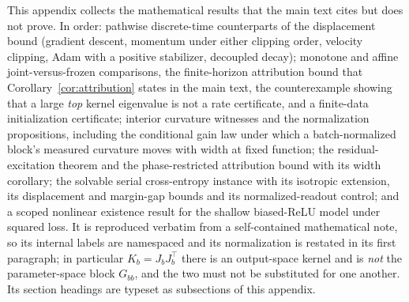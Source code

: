 This appendix collects the mathematical results that the main text cites but
does not prove. In order: pathwise discrete-time counterparts of the
displacement bound (gradient descent, momentum under either clipping order,
velocity clipping, Adam with a positive stabilizer, decoupled decay);
monotone and affine joint-versus-frozen comparisons, the finite-horizon
attribution bound that Corollary~\ref{cor:attribution} states in the main
text, the counterexample showing that a large \emph{top} kernel eigenvalue
is not a rate certificate, and a finite-data initialization certificate;
interior curvature witnesses and the normalization propositions, including
the conditional gain law under which a batch-normalized block's measured
curvature moves with width at fixed function; the residual-excitation
theorem and the phase-restricted attribution bound with its width
corollary; the solvable serial cross-entropy instance with its isotropic
extension, its displacement and margin-gap bounds and its normalized-readout
control; and a scoped nonlinear existence result for the shallow
biased-ReLU model under squared loss. It is reproduced verbatim from a
self-contained mathematical note, so its internal labels are namespaced and
its normalization is restated in its first paragraph; in particular
$K_b = J_b J_b^\top$ there is an output-space kernel and is \emph{not} the
parameter-space block $G_{bb}$, and the two must not be substituted for one
another. Its section headings are typeset as subsections of this appendix.

\begingroup
\let\section\subsection
\let\subsection\subsubsection

\endgroup

